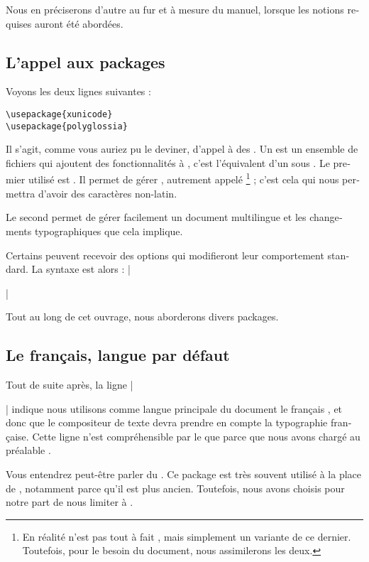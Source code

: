 Nous en préciserons d'autre au fur et à mesure du manuel, lorsque les notions requises auront été abordées.

\subsection{L'appel aux packages}

Voyons les deux lignes suivantes : 
\begin{verbatim}
\usepackage{xunicode}
\usepackage{polyglossia}
\end{verbatim}

Il s'agit, comme vous auriez pu le deviner, d'appel à des . Un  est un ensemble de fichiers qui ajoutent des fonctionnalités à , c'est l'équivalent d'un  sous . Le premier  utilisé est . Il permet de gérer , autrement appelé \footnote{En réalité  n'est pas tout à fait , mais simplement un variante de ce dernier. Toutefois, pour le besoin du document, nous assimilerons les deux.} ; c'est cela qui nous permettra d'avoir des caractères non-latin.

Le second permet de gérer facilement un document multilingue et les changements typographiques que cela implique.

Certains  peuvent recevoir des options qui modifieront leur comportement standard. La syntaxe est alors : |\usepackage[options]{package}|

Tout au long de cet ouvrage, nous aborderons divers packages.

\subsection{Le fran\c cais, langue par défaut}

Tout de suite après, la ligne |\setmainlanguage{french}| indique nous utilisons comme langue principale du document le fran\c cais , et donc que le compositeur de texte devra prendre en compte la typographie fran\c caise. Cette ligne n'est compréhensible par le  que parce que nous avons chargé au préalable .

\begin{anedocte}
Vous entendrez peut-être parler du  . Ce package est très souvent utilisé à la place de , notamment parce qu'il est plus ancien. Toutefois, nous avons choisis pour notre part de nous limiter à .
\end{anedocte}
